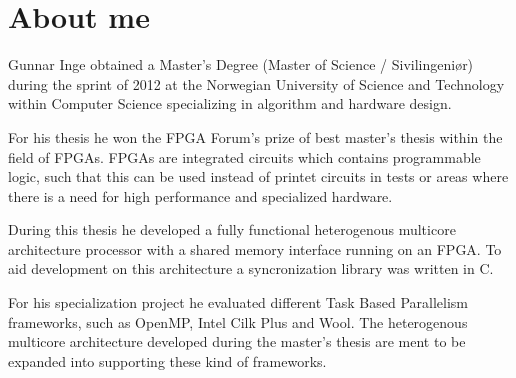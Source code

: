 \documentclass[a4paper,10pt]{article}
\begin{document}
\vskip 0.5cm


\section{About me}
Gunnar Inge obtained a Master's Degree (Master of Science /
Sivilingeniør) during the sprint of 2012 at the Norwegian University of Science and Technology
within Computer Science specializing in algorithm and hardware design.

For his thesis he won the FPGA Forum's prize of best master's thesis
within the field of FPGAs. FPGAs are integrated circuits which
contains programmable logic, such that this can be used instead of
printet circuits in tests or areas where there is a need for high
performance and specialized hardware.

During this thesis he developed a fully functional heterogenous multicore architecture processor with a shared memory interface running on an FPGA. To aid development on this architecture a syncronization library was written in C.

For his specialization project he evaluated different Task Based
Parallelism frameworks, such as OpenMP, Intel Cilk Plus and Wool. The
heterogenous multicore architecture developed during the master's
thesis are ment to be expanded into supporting these kind of frameworks.

\end{document}
